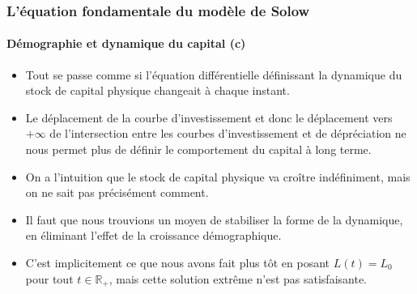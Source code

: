 \documentclass[10pt,notheorems]{beamer}
\theoremstyle{plain}
\theoremstyle{definition} %
\begin{document}
\begin{frame}
\end{frame}


\begin{frame}
  \frametitle{L'équation fondamentale du modèle de Solow}
  \framesubtitle{Démographie et dynamique du capital (c)}

  \bigskip

  \begin{itemize}

  \item Tout se passe comme si l'équation différentielle définissant
    la dynamique du stock de capital physique changeait à chaque instant.\newline

  \item Le déplacement de la courbe d'investissement et donc le
    déplacement vers $+\infty$ de l'intersection entre les courbes
    d'investissement et de dépréciation ne nous permet plus de définir
    le comportement du capital à long terme.\newline

  \item On a l'intuition que le stock de capital physique va croître indéfiniment, mais on ne sait pas précisément comment.\newline

  \item Il faut que nous trouvions un moyen de stabiliser la forme de
    la dynamique, en éliminant l'effet de la croissance
    démographique.\newline

  \item C'est implicitement ce que nous avons fait plus tôt en posant
    $L(t)=L_0$ pour tout $t\in\mathbb R_+$, mais cette solution
    extrême n'est pas satisfaisante.

  \end{itemize}

\end{frame}
\end{document}
